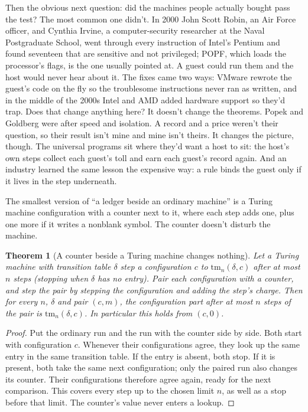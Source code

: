 \documentclass[11pt,twoside]{article}
\theoremstyle{thielethm}
\newtheorem{theorem}{Theorem}[section]
\theoremstyle{thieledef}
\theoremstyle{thieledef}
\theoremstyle{thieledef}
\theoremstyle{thielethm}
\theoremstyle{thieleobs}
\theoremstyle{thielethm}
\begin{document}
Then the obvious next question: did the machines people actually bought pass the test? The most
common one didn't. In 2000 John Scott Robin, an Air Force officer, and Cynthia Irvine, a
computer-security researcher at the Naval Postgraduate School, went through every instruction
of Intel's Pentium and found seventeen that are sensitive and not privileged; POPF, which loads
the processor's flags, is the one usually pointed at. A guest could run them and the host would
never hear about it. The fixes came two ways: VMware rewrote the guest's code on the fly so the
troublesome instructions never ran as written, and in the middle of the 2000s Intel and AMD
added hardware support so they'd trap. Does that change anything here? It doesn't change the theorems. Popek
and Goldberg were after speed and isolation. A record and a price weren't their question, so their result isn't
mine and mine isn't theirs. It changes the picture, though. The universal programs sit where
they'd want a host to sit: the host's own steps collect each guest's toll and earn each guest's
record again. And an industry learned the same lesson the expensive way: a rule binds the guest
only if it lives in the step underneath.

The smallest version of ``a ledger beside an ordinary machine'' is a Turing machine
configuration with a counter next to it, where each step adds one, plus one more if it writes
a nonblank symbol. The counter doesn't disturb the machine.

\begin{theorem}[A counter beside a Turing machine changes nothing]\label{thm:u19-tm-lift}
Let a Turing machine with transition table $\delta$ step a configuration $c$ to
$\mathrm{tm}_n(\delta, c)$ after at most $n$ steps (stopping when $\delta$ has no entry). Pair
each configuration with a counter, and step the pair by stepping the configuration and adding
the step's charge. Then for every $n$, $\delta$ and pair $(c, m)$, the configuration part
after at most $n$ steps of the pair is $\mathrm{tm}_n(\delta, c)$. In particular this holds
from $(c, 0)$.
\end{theorem}

\begin{proof}
Put the ordinary run and the run with the counter side by side. Both start
with configuration $c$. Whenever their configurations agree, they look up the
same entry in the same transition table. If the entry is absent, both stop.
If it is present, both take the same next configuration; only the paired run
also changes its counter. Their configurations therefore agree again, ready
for the next comparison. This covers every step up to the chosen limit $n$,
as well as a stop before that limit. The counter's value never enters a lookup.
\end{proof}
\end{document}
